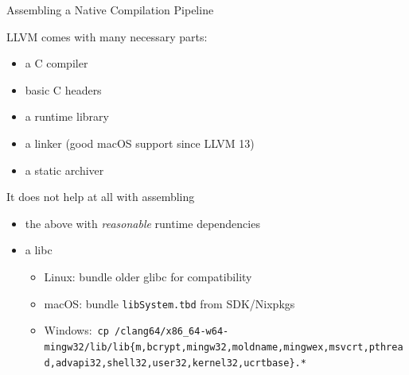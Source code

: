 \documentclass[en,t,navbarkit]{sdqbeamer}
\begin{document}
\begin{frame}[fragile]{Assembling a Native Compilation Pipeline}

  LLVM comes with many necessary parts:
  \begin{itemize}
    \item a C compiler
    \item basic C headers
    \item a runtime library
    \item a linker (good macOS support since LLVM 13)
    \item a static archiver
  \end{itemize}

  \vspace{3mm}
  \pause

  It does not help at all with assembling
  \begin{itemize}
    \item the above with \emph{reasonable} runtime dependencies
    \item a libc
          \begin{itemize}
            \item Linux: bundle older glibc for compatibility
            \item macOS: bundle \texttt{libSystem.tbd} from SDK/Nixpkgs
            \item Windows:~\pause\verb!cp /clang64/x86_64-w64-mingw32/lib/lib{m,bcrypt,mingw32,moldname,mingwex,msvcrt,pthread,advapi32,shell32,user32,kernel32,ucrtbase}.*!
          \end{itemize}
  \end{itemize}
\end{frame}

\end{document}
